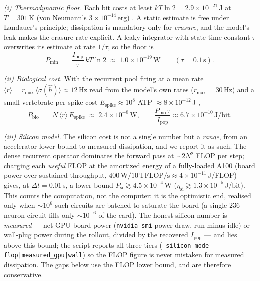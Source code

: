 \documentclass[11pt]{article}
\begin{document}
\emph{(i) Thermodynamic floor.} Each bit costs at least
$kT\ln 2 = 2.9\times10^{-21}\,\mathrm{J}$ at $T=301$\,K (von Neumann's
$3\times10^{-14}$\,erg) \citep{landauer1961}. A static estimate is free under
Landauer's principle; dissipation is mandatory only for \emph{erasure}, and
the model's leak makes the erasure rate explicit. A leaky integrator with
state time constant $\tau$ overwrites its estimate at rate $1/\tau$, so the
floor is
\begin{equation}
P_{\min} \;=\; \frac{I_{\mathrm{pop}}}{\tau}\,kT\ln 2
\;\approx\; 1.0\times10^{-19}\,\mathrm{W}
\qquad (\tau = 0.1\,\mathrm{s}).
\label{eq:cx_landauer}
\end{equation}

\emph{(ii) Biological cost.} With the recurrent pool firing at a mean rate
$\langle r\rangle = r_{\max}\,\langle\sigma(\hat h)\rangle \approx 12$\,Hz
read from the model's own rates ($r_{\max}=30$\,Hz) and a small-vertebrate
per-spike cost $E_{\mathrm{spike}}\approx10^{8}$ ATP
$\approx 8\times10^{-12}$\,J \citep{attwell2001,laughlin1998},
\begin{equation}
P_{\mathrm{bio}} \;=\; N\,\langle r\rangle\,E_{\mathrm{spike}}
\;\approx\; 2.4\times10^{-8}\,\mathrm{W},
\qquad
\frac{P_{\mathrm{bio}}\,\tau}{I_{\mathrm{pop}}} \approx 6.7\times10^{-10}\,
\mathrm{J/bit}.
\label{eq:cx_bio}
\end{equation}

\emph{(iii) Silicon model.} The silicon cost is not a single number but a
\emph{range}, from an accelerator lower bound to measured dissipation, and we
report it as such. The dense recurrent operator dominates the forward pass at
$\sim\!2N^2$ FLOP per step; charging each \emph{useful} FLOP at the amortized
energy of a fully-loaded A100 (board power over sustained throughput,
$400\,\mathrm{W} / 10\,\mathrm{TFLOP/s}\approx 4\times10^{-11}$\,J/FLOP) gives,
at $\Delta t = 0.01$\,s, a lower bound $P_{\mathrm{si}}\gtrsim4.5\times10^{-4}$\,W
($\eta_{\mathrm{si}}\gtrsim1.3\times10^{-5}$\,J/bit). This counts the
computation, not the computer: it is the optimistic end, realised only when
$\sim\!10^{6}$ such circuits are batched to saturate the board (a single
$236$-neuron circuit fills only $\sim\!10^{-6}$ of the card). The honest
silicon number is \emph{measured} --- net GPU board power (\texttt{nvidia-smi}
power draw, run minus idle) or wall-plug power during the rollout, divided by
the recovered $I_{\mathrm{pop}}$ --- and lies above this bound; the script
reports all three tiers (\texttt{--silicon\_mode flop|measured\_gpu|wall}) so
the FLOP figure is never mistaken for measured dissipation. The gaps below use
the FLOP lower bound, and are therefore conservative.
\end{document}
